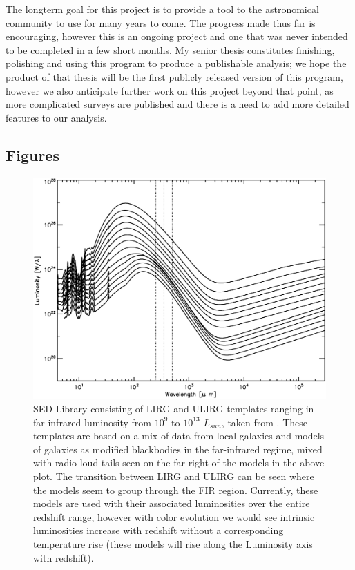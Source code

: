\documentclass[twocolumn,letterpaper,10pt]{article}
\begin{document}
The longterm goal for this project is to provide a tool to the astronomical community to use for many years to come. The progress made thus far is encouraging, however this is an ongoing project and one that was never intended to be completed in a few short months. My senior thesis constitutes finishing, polishing and using this program to produce a publishable analysis; we hope the product of that thesis will be the first publicly released version of this program, however we also anticipate further work on this project beyond that point, as more complicated surveys are published and there is a need to add more detailed features to our analysis.



\clearpage


\appendix
\begin{onecolumn}
\section{Figures}

\begin{figure}[h]
  \includegraphics[width=\textwidth,trim=0.25in 0.25in 0.25in 0.25in,clip=true]{models.eps}
  \caption{SED Library consisting of LIRG and ULIRG templates ranging in far-infrared luminosity from $10^9$ to $10^13$ $L_{sun}$, taken from \citet{rieke09}. These templates are based on a mix of data from local galaxies and models of galaxies as modified blackbodies in the far-infrared regime, mixed with radio-loud tails seen on the far right of the models in the above plot. The transition between LIRG and ULIRG can be seen where the models seem to group through the FIR region. Currently, these models are used with their associated luminosities over the entire redshift range, however with color evolution we would see intrinsic luminosities increase with redshift without a corresponding temperature rise (these models will rise along the Luminosity axis with redshift).}
  \label{slib}
\end{figure}


\end{onecolumn}
\end{document}
